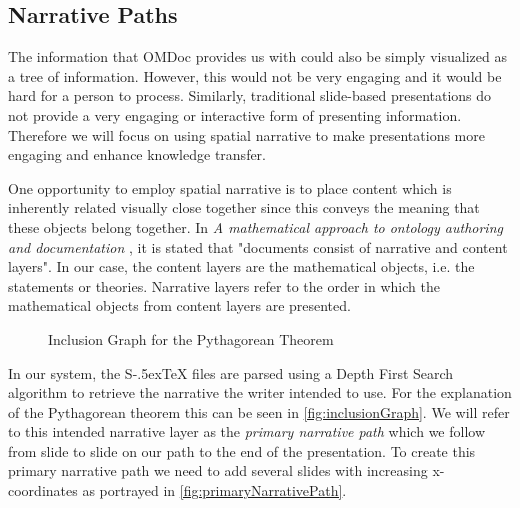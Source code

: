 \documentclass{llncs}
\def\stex{\texorpdfstring{\raisebox{-.5ex}S\kern-.5ex\TeX}{sTeX}\xspace}
\begin{document}
\subsection{Narrative Paths}
\label{sec:narrativePaths}

The information that OMDoc provides us with could also be simply visualized as a tree of information. However, this would not be very engaging and it would be hard for a person to process. Similarly, traditional slide-based presentations do not provide a very engaging or interactive form of presenting information. Therefore we will focus on using spatial narrative to make presentations more engaging and enhance knowledge transfer. 

One opportunity to employ spatial narrative is to place content which is inherently related visually close together since this conveys the meaning that these objects belong together. In \textit{A mathematical approach to ontology authoring and documentation} \cite{LK:MathOntoAuthDoc09}, it is stated that "documents consist of narrative and content layers". In our case, the content layers are the mathematical objects, i.e. the statements or theories. Narrative layers refer to the order in which the mathematical objects from content layers are presented.

\begin{figure}
\vspace{-35pt}
  \begin{center}
\vspace{-0pt}
  \caption{Inclusion Graph for the Pythagorean Theorem}
  \label{fig:inclusionGraph}
\vspace{12pt}
  \end{center}
\end{figure}

\begin{figure}
\vspace{-50pt}
\end{figure}

In our system, the \stex files are parsed using a Depth First Search algorithm to retrieve the narrative the writer intended to use. For the explanation of the Pythagorean theorem this can be seen in \autoref{fig:inclusionGraph}. We will refer to this intended narrative layer as the \textit{primary narrative path} which we follow from slide to slide on our path to the end of the presentation. To create this primary narrative path we need to add several slides with increasing x-coordinates as portrayed in \autoref{fig:primaryNarrativePath}.
\end{document}
